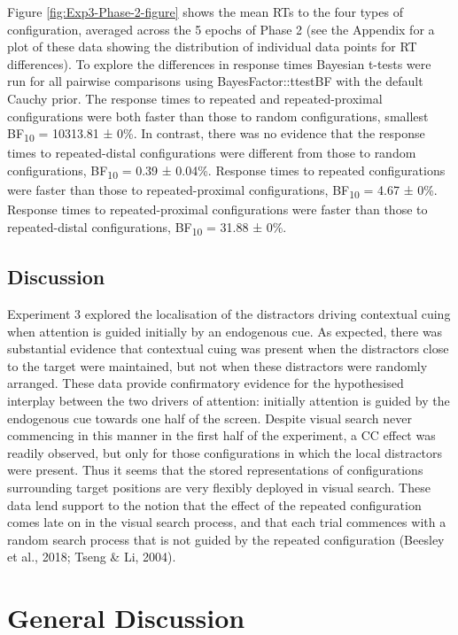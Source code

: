 \documentclass[
  man,floatsintext]{apa7}
\begin{document}
Figure \ref{fig:Exp3-Phase-2-figure} shows the mean RTs to the four types of configuration, averaged across the 5 epochs of Phase 2 (see the Appendix for a plot of these data showing the distribution of individual data points for RT differences). To explore the differences in response times Bayesian t-tests were run for all pairwise comparisons using BayesFactor::ttestBF with the default Cauchy prior. The response times to repeated and repeated-proximal configurations were both faster than those to random configurations, smallest BF\textsubscript{10} = 10313.81 ± 0\%. In contrast, there was no evidence that the response times to repeated-distal configurations were different from those to random configurations, BF\textsubscript{10} = 0.39 ± 0.04\%. Response times to repeated configurations were faster than those to repeated-proximal configurations, BF\textsubscript{10} = 4.67 ± 0\%. Response times to repeated-proximal configurations were faster than those to repeated-distal configurations, BF\textsubscript{10} = 31.88 ± 0\%.

\hypertarget{discussion-2}{%
\subsection{Discussion}\label{discussion-2}}

Experiment 3 explored the localisation of the distractors driving contextual cuing when attention is guided initially by an endogenous cue. As expected, there was substantial evidence that contextual cuing was present when the distractors close to the target were maintained, but not when these distractors were randomly arranged. These data provide confirmatory evidence for the hypothesised interplay between the two drivers of attention: initially attention is guided by the endogenous cue towards one half of the screen. Despite visual search never commencing in this manner in the first half of the experiment, a CC effect was readily observed, but only for those configurations in which the local distractors were present. Thus it seems that the stored representations of configurations surrounding target positions are very flexibly deployed in visual search. These data lend support to the notion that the effect of the repeated configuration comes late on in the visual search process, and that each trial commences with a random search process that is not guided by the repeated configuration (Beesley et al., 2018; Tseng \& Li, 2004).

\hypertarget{general-discussion}{%
\section{General Discussion}\label{general-discussion}}
\end{document}
